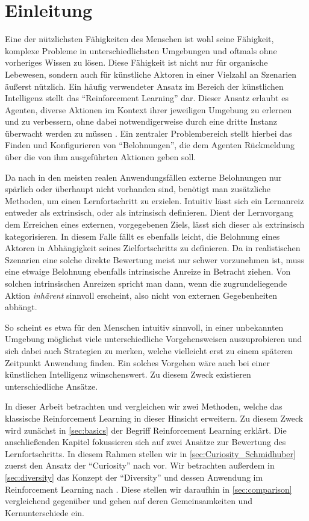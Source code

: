 \section{Einleitung}
\label{sec:intro}
Eine der nützlichsten Fähigkeiten des Menschen ist wohl seine Fähigkeit, komplexe Probleme in unterschiedlichsten Umgebungen und oftmals ohne vorheriges Wissen zu lösen.
Diese Fähigkeit ist nicht nur für organische Lebewesen, sondern auch für künstliche Aktoren in einer Vielzahl an Szenarien äußerst nützlich.
Ein häufig verwendeter Ansatz im Bereich der künstlichen Intelligenz stellt das ``Reinforcement Learning'' dar. Dieser Ansatz erlaubt es Agenten, diverse Aktionen im Kontext ihrer jeweiligen Umgebung zu erlernen und zu verbessern, ohne dabei notwendigerweise durch eine dritte Instanz überwacht werden zu müssen \cite{reinforcement_learning_kaelbling}. 
Ein zentraler Problembereich stellt hierbei das Finden und Konfigurieren von ``Belohnungen'', die dem Agenten Rückmeldung über die von ihm ausgeführten Aktionen geben soll.

Da nach \cite{reachability_savinov} in den meisten realen Anwendungsfällen externe Belohnungen nur spärlich oder überhaupt nicht vorhanden sind, benötigt man zusätzliche Methoden, um einen Lernfortschritt zu erzielen.
Intuitiv lässt sich ein Lernanreiz entweder als extrinsisch, oder als intrinsisch definieren. Dient der Lernvorgang dem Erreichen eines externen, vorgegebenen Ziels, lässt sich dieser als extrinsisch kategorisieren. In diesem Falle fällt es ebenfalls leicht, die Belohnung eines Aktoren in Abhängigkeit seines Zielfortschritts zu definieren. 
Da in realistischen Szenarien eine solche direkte Bewertung meist nur schwer vorzunehmen ist, muss eine etwaige Belohnung ebenfalls intrinsische Anreize in Betracht ziehen. Von solchen intrinsischen Anreizen spricht man dann, wenn die zugrundeliegende Aktion \textit{inhärent} sinnvoll erscheint, also nicht von  externen Gegebenheiten abhängt.

So scheint es etwa für den Menschen intuitiv sinnvoll, in einer unbekannten Umgebung möglichst viele unterschiedliche Vorgehensweisen auszuprobieren und sich dabei auch Strategien zu merken, welche vielleicht erst zu einem späteren Zeitpunkt Anwendung finden. Ein solches Vorgehen wäre auch bei einer künstlichen Intelligenz wünschenswert. Zu diesem Zweck existieren unterschiedliche Ansätze.

In dieser Arbeit betrachten und vergleichen wir zwei Methoden, welche das klassische Reinforcement Learning in dieser Hinsicht erweitern.
Zu diesem Zweck wird zunächst in \ref{sec:basics} der Begriff Reinforcement Learning erklärt.
Die anschließenden Kapitel fokussieren sich auf zwei Ansätze zur Bewertung des Lernfortschritts.
In diesem Rahmen stellen wir in \ref{sec:Curiosity_Schmidhuber} zuerst den Ansatz der ``Curiosity'' nach \cite{curiosity_schmidhuber} vor. 
Wir betrachten außerdem in \ref{sec:diversity} das Konzept der ``Diversity'' und dessen Anwendung im Reinforcement Learning nach \cite{diversity_eysenbach}.
Diese stellen wir daraufhin in \ref{sec:comparison} vergleichend gegenüber und gehen auf deren Gemeinsamkeiten und Kernunterschiede ein.

